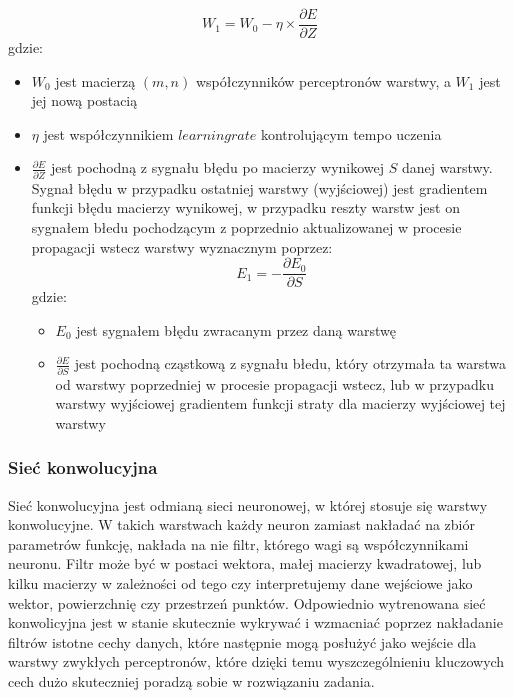 \documentclass{article}
\begin{document}
\begin{equation}
    W_1 = W_0 - \eta \times \frac{\partial E}{\partial Z}
\end{equation}
gdzie:
\begin{itemize}
    \item $W_0$ jest macierzą $(m, n)$ współczynników perceptronów warstwy, a $W_1$ jest jej nową postacią
    \item $\eta$ jest współczynnikiem $learning rate$ kontrolującym tempo uczenia
    \item $\frac{\partial E}{\partial Z}$ jest pochodną z sygnału błędu po 
    macierzy wynikowej $S$ danej warstwy. Sygnał błędu w przypadku ostatniej warstwy (wyjściowej) jest
    gradientem funkcji błędu macierzy wynikowej, w przypadku reszty warstw 
    jest on sygnałem błedu pochodzącym z poprzednio aktualizowanej w procesie propagacji wstecz warstwy
    wyznacznym poprzez:
    \begin{equation}
        E_1 = -\frac{\partial E_0}{\partial S}
    \end{equation}
    gdzie:
    \begin{itemize}
        \item $E_0$ jest sygnałem błędu zwracanym przez daną warstwę
        \item $\frac{\partial E}{\partial S}$ jest pochodną cząstkową z sygnału błedu, 
        który otrzymała ta warstwa od warstwy poprzedniej w procesie propagacji wstecz, lub w przypadku warstwy
        wyjściowej gradientem funkcji straty dla macierzy wyjściowej tej warstwy
    \end{itemize}
\end{itemize}

\subsubsection{Sieć konwolucyjna}
Sieć konwolucyjna jest odmianą sieci neuronowej, 
w której stosuje się warstwy konwolucyjne. W takich 
warstwach każdy neuron zamiast nakładać na zbiór parametrów 
funkcję, nakłada na nie filtr, którego wagi są współczynnikami 
neuronu. Filtr może być w postaci wektora, małej macierzy kwadratowej, 
lub kilku macierzy w zależności od tego czy interpretujemy dane wejściowe 
jako wektor, powierzchnię czy przestrzeń punktów. Odpowiednio wytrenowana 
sieć konwolicyjna jest w stanie skutecznie wykrywać i wzmacniać poprzez 
nakładanie filtrów istotne cechy danych, które następnie mogą posłużyć 
jako wejście dla warstwy zwykłych perceptronów, które dzięki temu wyszczególnieniu 
kluczowych cech dużo skuteczniej poradzą sobie w rozwiązaniu zadania.
\end{document}
